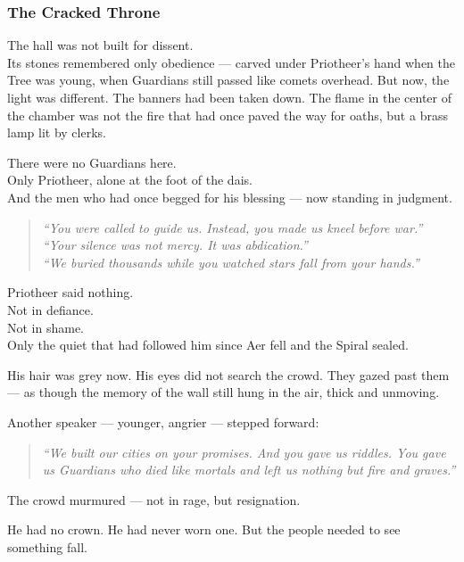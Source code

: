 \documentclass[12pt]{article}
\begin{document}
\vspace{.5in}

\subsubsection*{The Cracked Throne}

The hall was not built for dissent.\\
Its stones remembered only obedience --- carved under Priotheer’s hand when the Tree was young, when Guardians still passed like comets overhead. But now, the light was different. The banners had been taken down. The flame in the center of the chamber was not the fire that had once paved the way for oaths, but a brass lamp lit by clerks.

There were no Guardians here.\\
Only Priotheer, alone at the foot of the dais.\\
And the men who had once begged for his blessing --- now standing in judgment.

\begin{quote}
\textit{“You were called to guide us. Instead, you made us kneel before war.”}\\
\textit{“Your silence was not mercy. It was abdication.”}\\
\textit{“We buried thousands while you watched stars fall from your hands.”}
\end{quote}

Priotheer said nothing.\\
Not in defiance.\\
Not in shame.\\
Only the quiet that had followed him since Aer fell and the Spiral sealed.

His hair was grey now. His eyes did not search the crowd. They gazed past them --- as though the memory of the wall still hung in the air, thick and unmoving.

Another speaker --- younger, angrier --- stepped forward:

\begin{quote}
\textit{“We built our cities on your promises. And you gave us riddles. You gave us Guardians who died like mortals and left us nothing but fire and graves.”}
\end{quote}

The crowd murmured --- not in rage, but resignation.

He had no crown. He had never worn one. But the people needed to see something fall.
\end{document}
